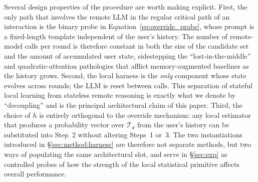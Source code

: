Several design properties of the procedure are worth making explicit.
First, the only path that involves the remote LLM in the regular
critical path of an interaction is the binary probe in
Equation~\eqref{eq:override_probe}, whose prompt is a fixed-length
template independent of the user's history. The number of remote-model
calls per round is therefore constant in both the size of the candidate
set and the amount of accumulated user state, sidestepping the
``lost-in-the-middle'' and quadratic-attention pathologies that
afflict memory-augmented baselines as the history grows. Second, the
local harness is the \emph{only} component whose state evolves across
rounds; the LLM is reset between calls. This separation of stateful
local learning from stateless remote reasoning is exactly what we
denote by ``decoupling'' and is the principal architectural claim of
this paper. Third, the choice of $h$ is entirely orthogonal to the
override mechanism: any local estimator that produces a probability
vector over $\mathcal{T}_d$ from the user's history can be substituted
into Step~2 without altering Steps~1 or~3. The two instantiations
introduced in \S\ref{sec:method:harness} are therefore not separate
methods, but two ways of populating the same architectural slot, and
serve in \S\ref{sec:exp} as controlled probes of how the strength of
the local statistical primitive affects overall performance.
